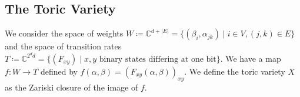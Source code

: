 %
%
%
%
%
%
%

\subsection*{The Toric Variety}

We consider the space of weights $W \coloneqq \mathbb C^{d+|E|} = \{(\beta_{i},\alpha_{jk})\mid i\in V,(j,k)\in E\}$ and the space of transition rates $T \coloneqq \mathbb C^{2^{d}d} = \{(F_{xy}) \mid x,y \text{ binary states differing at one bit}\}$. We have a map
$f\colon W\to T$ defined by $f(\alpha,\beta) = (F_{xy}(\alpha,\beta))_{xy}$. We define the toric variety $X$ as the Zariski closure of the image of $f$.

